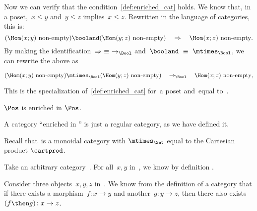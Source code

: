 {\begin{example}
        Now we can verify that the condition~\cref{def:enriched_cat} holds.
        We know that, in a poset,~$x \leq y$ and~$y \leq z$ implies~$x \leq z$.
        Rewritten in the language of categories, this is:
        \begin{equation*}
            (\Hom(x;y)\ \text{non-empty})
            \booland
            (\Hom(y; z)\ \text{non-empty})
            \quad
            \Rightarrow
            \quad
            \Hom(x; z)\ \text{non-empty}.
        \end{equation*}
        By making the identification~$\Rightarrow\ \equiv\ \to_{\Bool}$ and~$\booland\ \equiv\ \mtimes_{\Bool}$, we can rewrite the above as
        \begin{widepar}
            \begin{equation*}
                (\Hom(x;y)\ \text{non-empty})
                \mtimes_{\Bool}
                (\Hom(y; z)\ \text{non-empty})
                \quad
                \to_{\Bool}
                \quad
                \Hom(x; z)\ \text{non-empty},
            \end{equation*}
        \end{widepar}
        This is the specialization of~\cref{def:enriched_cat} for~\CatC a poset and~\CatD equal to~\Bool.
    \end{example}
    \begin{example}
        $\Pos$ is enriched in $\Pos$.
    \end{example}

    \begin{example}
    \end{example}

    \begin{example}
        A category ``enriched in \Set'' is just a regular category, as we have defined it.

        Recall that~\Set is a monoidal category with $\mtimes_{\Set}$ equal to the Cartesian product $\cartprod$.

        Take an arbitrary category~\CatC.
        For all~$x, y$ in~\CatC, we know by definition .

        Consider three objects~$x,y,z$ in~\CatC.
        We know from the definition of a category that if there exists a morphism~$f: x \to y$ and another~$g: y \to z$, then there also exists~$(f\then g)\colon x \to z$.


\end{example}}
